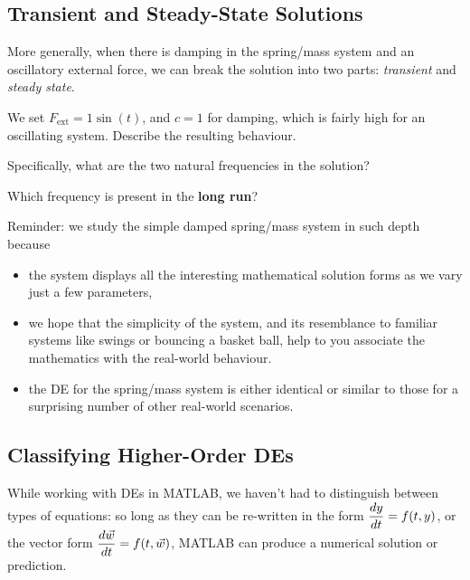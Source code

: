 \newpage

\subsection*{Transient and Steady-State Solutions}

More generally, when there is damping in the spring/mass system and
an oscillatory external force, we can break the solution into two
parts: {\em transient} and {\em steady state}.

We set $F_{\mbox{ext}} = 1 \sin(t)$, and $c = 1$ for damping, which is fairly
high for an oscillating system.  Describe the resulting behaviour.

\vfill

Specifically, what are the two natural frequencies in the solution?

\vfill

Which frequency is present in the {\bf long run}?

\vfill

\newpage

Reminder: we study the simple damped spring/mass system in such depth
because
\begin{itemize}
\item the system displays all the interesting mathematical solution
  forms as we vary just a few parameters, 
\item we hope that the simplicity of the system, and its resemblance
  to familiar systems like swings or bouncing a basket ball, help to
  you associate the mathematics with the real-world behaviour.
\item the DE for the spring/mass system is either identical or similar
  to those for a surprising number of other real-world scenarios.
\end{itemize}



\newpage

\subsection*{Classifying Higher-Order DEs}

While working with DEs in MATLAB, we haven't had to distinguish
between types of equations: so long as they can be re-written in the
form $\displaystyle \frac{dy}{dt} = f(t, y)$, or the vector form
$\displaystyle \frac{d\vec{w}}{dt} = f(t, \vec{w})$, MATLAB can produce a
numerical solution or prediction. \\[1ex]

